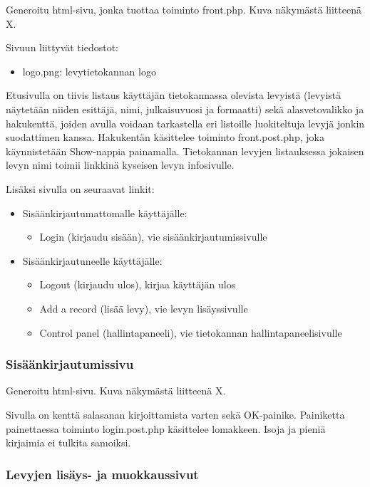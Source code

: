 \documentclass[a4paper,12pt]{report}
\begin{document}
Generoitu html-sivu, jonka tuottaa toiminto front.php. Kuva näkymästä
liitteenä X.

Sivuun liittyvät tiedostot:
\begin{itemize}
  \item logo.png: levytietokannan logo
\end{itemize}

Etusivulla on tiivis listaus käyttäjän tietokannassa olevista levyistä
(levyistä näytetään niiden esittäjä, nimi, julkaisuvuosi ja formaatti) sekä
alasvetovalikko ja hakukenttä, joiden avulla voidaan tarkastella eri
listoille luokiteltuja levyjä jonkin suodattimen kanssa.  Hakukentän
käsittelee toiminto front.post.php, joka käynnistetään Show-nappia
painamalla.  Tietokannan levyjen listauksessa jokaisen levyn nimi toimii
linkkinä kyseisen levyn infosivulle.

Lisäksi sivulla on seuraavat linkit:

\begin{itemize}
  \item Sisäänkirjautumattomalle käyttäjälle:
    \begin{itemize}
	    \item Login (kirjaudu sisään),
		    vie sisäänkirjautumissivulle
    \end{itemize}

  \item Sisäänkirjautuneelle käyttäjälle:
    \begin{itemize}
	    \item Logout (kirjaudu ulos),
		    kirjaa käyttäjän ulos
	    \item Add a record (lisää levy),
		    vie levyn lisäyssivulle
	    \item Control panel (hallintapaneeli),
		    vie tietokannan hallintapaneelisivulle
    \end{itemize}
\end{itemize}

\subsubsection{Sisäänkirjautumissivu}

Generoitu html-sivu. Kuva näkymästä liitteenä X.

Sivulla on kenttä salasanan kirjoittamista varten sekä OK-painike.
Painiketta painettaessa toiminto login.post.php käsittelee lomakkeen.  Isoja
ja pieniä kirjaimia ei tulkita samoiksi.

\subsubsection{Levyjen lisäys- ja muokkaussivut}
\end{document}
